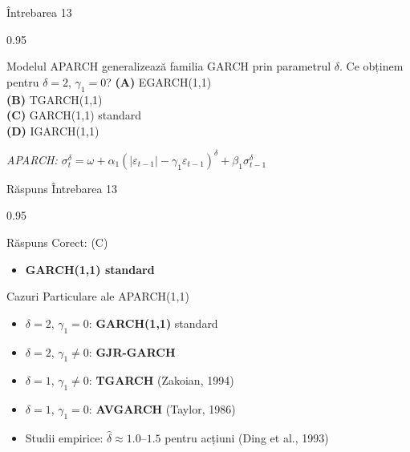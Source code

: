 \documentclass[9pt, aspectratio=169, t]{beamer}
\begin{document}
\begin{frame}{Întrebarea 13}
    \begin{cminipage}{0.95\textwidth}
    \begin{block}{Modelul APARCH generalizează familia GARCH prin parametrul $\delta$. Ce obținem pentru $\delta = 2$, $\gamma_1 = 0$?}
        \textcolor{MainBlue}{\textbf{(A)}} EGARCH(1,1)\\[3pt]
        \textcolor{MainBlue}{\textbf{(B)}} TGARCH(1,1)\\[3pt]
        \textcolor{MainBlue}{\textbf{(C)}} GARCH(1,1) standard\\[3pt]
        \textcolor{MainBlue}{\textbf{(D)}} IGARCH(1,1)
    \end{block}

    \vspace{0.3cm}

    \begin{center}
        \textit{APARCH: $\sigma_t^\delta = \omega + \alpha_1(|\varepsilon_{t-1}| - \gamma_1 \varepsilon_{t-1})^\delta + \beta_1 \sigma_{t-1}^\delta$}
    \end{center}
    \end{cminipage}
\end{frame}

\begin{frame}{Răspuns Întrebarea 13}
    \begin{cminipage}{0.95\textwidth}
    \begin{exampleblock}{Răspuns Corect: (C)}
        \begin{itemize}\setlength{\itemsep}{0pt}
            \item \textbf{GARCH(1,1) standard}
        \end{itemize}
    \end{exampleblock}

    \pause
    \begin{block}{Cazuri Particulare ale APARCH(1,1)}
        \begin{itemize}\setlength{\itemsep}{0pt}
            \item $\delta = 2$, $\gamma_1 = 0$: \textbf{GARCH(1,1)} standard
            \item $\delta = 2$, $\gamma_1 \neq 0$: \textbf{GJR-GARCH}
            \item $\delta = 1$, $\gamma_1 \neq 0$: \textbf{TGARCH} (Zakoian, 1994)
            \item $\delta = 1$, $\gamma_1 = 0$: \textbf{AVGARCH} (Taylor, 1986)
            \item Studii empirice: $\hat{\delta} \approx 1.0$--$1.5$ pentru acțiuni (Ding et al., 1993)
        \end{itemize}
    \end{block}
    \end{cminipage}
\end{frame}
\end{document}
